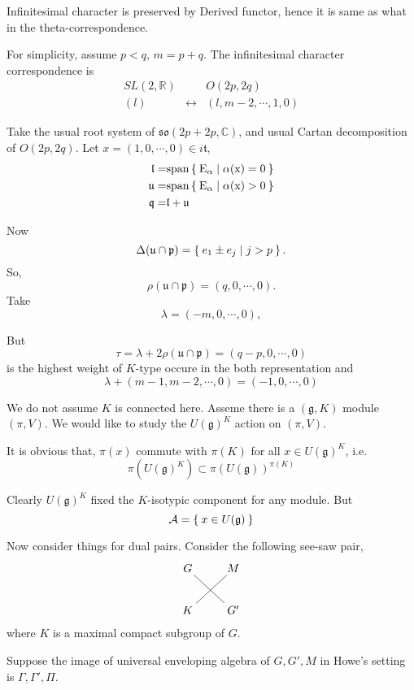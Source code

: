 \documentclass[12pt]{article}
\makeatletter
\def\bR{{\mathbb{R}}}
\def\bC{{\mathbb{C}}}
\def\sspan{\rm{span}}
\def\aso{\mathfrak{so}}
\def\fuu{\mathfrak{u}}
\def\fll{\mathfrak{l}}
\def\fpp{\mathfrak{p}}
\def\fqq{\mathfrak{q}}
\def\ftt{\mathfrak{t}}
\def\fgg{\mathfrak{g}}
\def\caa{\mathcal{A}}
\def\seesawpair#1#2#3#4{
\xymatrix{
{#1} \ar@{-}[dr]& {#2} \\
{#3} \ar@{-}[ur] & {#4}}
}
\newcounter{ssection}
\renewcommand{\subsection}{
  \addtocounter{ssection}{1}{\bf  \arabic{ssection}.\  }}
\makeatother
\begin{document}
 
Infinitesimal character is preserved by Derived functor, hence it is same as 
what in the theta-correspondence.

For simplicity, assume $p<q$, $m=p+q$. 
The infinitesimal character correspondence is 
\[
\begin{matrix}
 SL(2,\bR) & & O(2p,2q)\\
 (l) & \leftrightarrow & (l, m-2, \cdots, 1, 0)
\end{matrix}
\]

Take the usual root system of $\aso(2p+2p,\bC)$, and usual Cartan decomposition
of $O(2p,2q)$. 
Let $x = (1, 0,\cdots, 0)\in i\ftt$,
\begin{align*}
\fll =& \sspan \Set{E_\alpha |\alpha(x) =0 }\\
\fuu =& \sspan \Set{E_\alpha |\alpha(x) >0 }\\
\fqq =& \fll+\fuu
\end{align*}

Now 
\[
\Delta(\fuu\cap \fpp) = \Set{e_1\pm e_j|j>p}.
\]
So, 
\[
\rho(\fuu\cap \fpp) = (q, 0, \cdots, 0).
\]
Take
\[
\lambda = (-m, 0, \cdots, 0),
\]

But
\[
\tau = \lambda+2\rho(\fuu\cap\fpp) = (q-p, 0,\cdots, 0)
\]
is the highest weight of $K$-type occure in the both representation and
\[
\lambda + (m-1, m-2, \cdots, 0) = (-1, 0, \cdots, 0) 
\]

\subsection{$U(\fgg)^K$ action}
We do not assume $K$ is connected here.  
Asseme there is a $(\fgg,K)$ module $(\pi,V)$.
We would like to study the $U(\fgg)^K$ action on $(\pi,V)$. 

It is obvious that, 
$\pi(x)$ commute with $\pi(K)$ for all $x \in U(\fgg)^K$, i.e. 
\[
\pi(U(\fgg)^K) \subset \pi(U(\fgg))^{\pi(K)}
\]


Clearly $U(\fgg)^K$ fixed the $K$-isotypic component for any module.
But 
\[
\caa =\Set{x\in U(\fgg)}
\]

Now consider things for dual pairs.
Consider the following see-saw pair, 
\[
\seesawpair{G}{M}{K}{G'}
\]
where $K$ is a maximal compact subgroup of $G$. 

Suppose the image of universal enveloping algebra of $G,G',M$
in Howe's setting \cite{Howe1989Rem} is $\Gamma,\Gamma', \Pi$.
\end{document}
